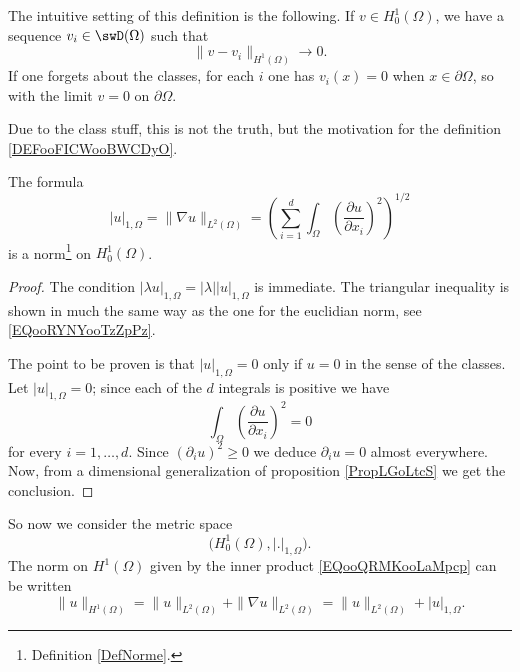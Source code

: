 \begin{normaltext}
    The intuitive setting of this definition is the following. If \( v\in H^1_0(\Omega)\), we have a sequence \( v_i\in \swD(\Omega)\) such that
    \begin{equation}
        \| v-v_i \|_{H^1(\Omega)}\to 0.
    \end{equation}
    If one forgets about the classes, for each \( i\) one has \( v_i(x)=0\) when \( x\in\partial\Omega\), so with the limit \( v=0\) on \( \partial\Omega\).

    Due to the class stuff, this is not the truth, but the motivation for the definition \ref{DEFooFICWooBWCDyO}.
\end{normaltext}

\begin{lemma}
    The formula
    \begin{equation}
        | u |_{1,\Omega}=\| \nabla u \|_{L^2(\Omega)}=\left( \sum_{i=1}^d\int_{\Omega}\left( \frac{ \partial u }{ \partial x_i } \right)^2 \right)^{1/2}
    \end{equation}
    is a norm\footnote{Definition \ref{DefNorme}.} on \( H_0^1(\Omega)\).
\end{lemma}

\begin{proof}
    The condition \( | \lambda u |_{1,\Omega}=| \lambda | | u |_{1,\Omega}\) is immediate. The triangular inequality is shown in much the same way as the one for the euclidian norm, see \eqref{EQooRYNYooTzZpPz}.

    The point to be proven is that \( | u |_{1,\Omega}=0\) only if \( u=0\) in the sense of the classes. Let \( | u |_{1,\Omega}=0\); since each of the \( d\) integrals is positive we have
    \begin{equation}
        \int_{\Omega}\left( \frac{ \partial u }{ \partial x_i } \right)^2=0
    \end{equation}
    for every \( i=1,\ldots, d\). Since \( (\partial_i u)^2\geq 0\) we deduce \( \partial_iu=0\) almost everywhere. Now, from a dimensional generalization of proposition \ref{PropLGoLtcS} we get the conclusion.
\end{proof}

So now we consider the metric space
\begin{equation}
    \big( H^1_0(\Omega),| . |_{1,\Omega} \big).
\end{equation}
The norm on \( H^1(\Omega)\) given by the inner product \eqref{EQooQRMKooLaMpcp} can be written
\begin{equation}
    \| u \|_{H^1(\Omega)}=\| u \|_{L^2(\Omega)}+\| \nabla u \|_{L^2(\Omega)}=\| u \|_{L^2(\Omega)}+| u |_{1,\Omega}.
\end{equation}


